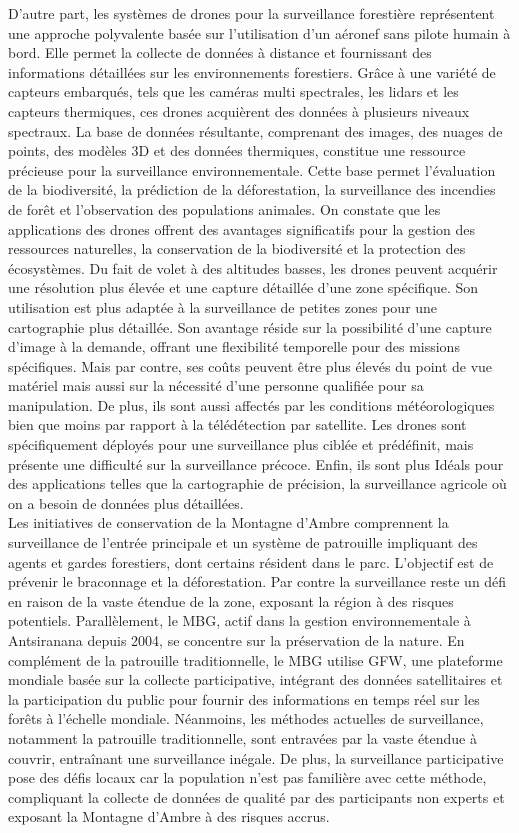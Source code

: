 D’autre part, les systèmes de drones pour la surveillance forestière représentent une approche polyvalente basée sur l’utilisation d’un aéronef sans pilote humain à bord. Elle permet la collecte de données à distance et fournissant des informations détaillées sur les environnements forestiers. Grâce à une variété de capteurs embarqués, tels que les caméras multi spectrales, les lidars et les capteurs thermiques, ces drones acquièrent des données à plusieurs niveaux spectraux. La base de données résultante, comprenant des images, des nuages de points, des modèles 3D et des données thermiques, constitue une ressource précieuse pour la surveillance environnementale. Cette base permet l'évaluation de la biodiversité, la prédiction de la déforestation, la surveillance des incendies de forêt et l'observation des populations animales. On constate que les applications des drones offrent des avantages significatifs pour la gestion des ressources naturelles, la conservation de la biodiversité et la protection des écosystèmes. Du fait de volet à des altitudes basses, les drones peuvent acquérir une résolution plus élevée et une capture détaillée d’une zone spécifique. Son utilisation est plus adaptée à la surveillance de petites zones pour une cartographie plus détaillée. Son avantage réside sur la possibilité d’une capture d'image à la demande, offrant une flexibilité temporelle pour des missions spécifiques. Mais par contre, ses coûts peuvent être plus élevés du point de vue matériel mais aussi sur la nécessité d’une personne qualifiée pour sa manipulation. De plus, ils sont aussi affectés par les conditions météorologiques bien que moins par rapport à la télédétection par satellite. Les drones sont spécifiquement déployés pour une surveillance plus ciblée et prédéfinit, mais présente une difficulté sur la surveillance précoce. Enfin, ils sont plus Idéals pour des applications telles que la cartographie de précision, la surveillance agricole où on a besoin de données plus détaillées.
\\
Les initiatives de conservation de la Montagne d'Ambre comprennent la surveillance de l'entrée principale et un système de patrouille impliquant des agents et gardes forestiers, dont certains résident dans le parc. L'objectif est de prévenir le braconnage et la déforestation. Par contre la surveillance reste un défi en raison de la vaste étendue de la zone, exposant la région à des risques potentiels. Parallèlement, le MBG, actif dans la gestion environnementale à Antsiranana depuis 2004, se concentre sur la préservation de la nature. En complément de la patrouille traditionnelle, le MBG utilise GFW, une plateforme mondiale basée sur la collecte participative, intégrant des données satellitaires et la participation du public pour fournir des informations en temps réel sur les forêts à l'échelle mondiale. Néanmoins, les méthodes actuelles de surveillance, notamment la patrouille traditionnelle, sont entravées par la vaste étendue à couvrir, entraînant une surveillance inégale. De plus, la surveillance participative pose des défis locaux car la population n'est pas familière avec cette méthode, compliquant la collecte de données de qualité par des participants non experts et exposant la Montagne d'Ambre à des risques accrus.

